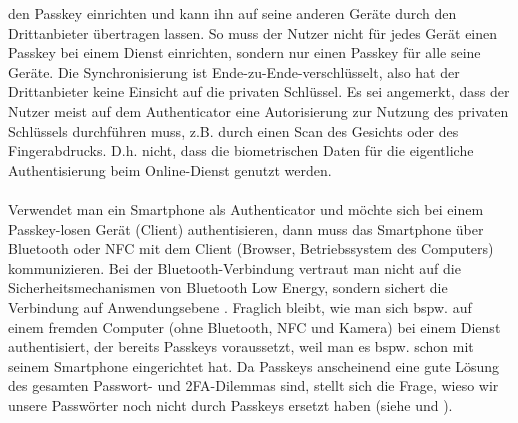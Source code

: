 den Passkey einrichten und kann ihn auf seine anderen Geräte durch den 
Drittanbieter übertragen lassen. So muss der Nutzer nicht für jedes 
Gerät einen Passkey bei einem Dienst einrichten, sondern nur einen 
Passkey für alle seine Geräte. Die Synchronisierung ist Ende-zu-Ende-verschlüsselt, also hat der Drittanbieter keine Einsicht auf die 
privaten Schlüssel. Es sei angemerkt, dass der Nutzer meist auf dem 
Authenticator eine Autorisierung zur Nutzung des privaten Schlüssels 
durchführen muss, z.B. durch einen Scan des Gesichts oder des 
Fingerabdrucks. D.h. nicht, dass die biometrischen Daten für die 
eigentliche Authentisierung beim Online-Dienst genutzt werden. \autocite
{PkFIDORes}
\\\\
Verwendet man ein Smartphone als Authenticator und möchte sich bei 
einem Passkey-losen Gerät (Client) authentisieren, dann muss das 
Smartphone über Bluetooth oder NFC mit dem Client (Browser, 
Betriebssystem des Computers) kommunizieren. Bei der 
Bluetooth-Verbindung vertraut man nicht auf die Sicherheitsmechanismen 
von Bluetooth Low Energy, sondern sichert die Verbindung auf 
Anwendungsebene \autocite{PkFIDORes}. Fraglich bleibt, wie man sich 
bspw. auf einem fremden Computer (ohne Bluetooth, NFC und Kamera) bei 
einem Dienst authentisiert, der bereits Passkeys voraussetzt, weil man 
es bspw. schon mit seinem Smartphone eingerichtet hat. Da Passkeys 
anscheinend eine gute Lösung des gesamten Passwort- und 
2FA-Dilemmas sind, stellt sich die Frage, wieso wir unsere Passwörter 
noch nicht durch Passkeys ersetzt haben (siehe \textcite{FidoRescue} und 
\textcite{lassakaren}).